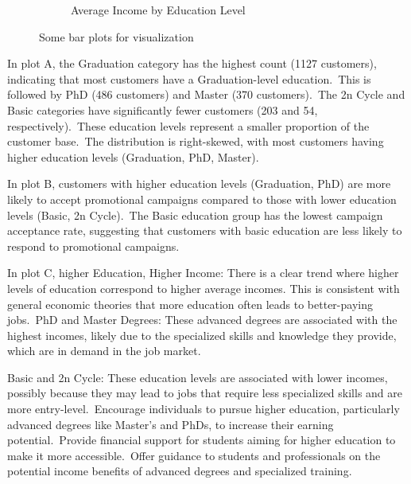\documentclass[a4paper]{article}
\begin{document}
\begin{figure}[h]
\begin{subfigure}{0.32\textwidth}
        \caption{Average Income by Education Level}
        \label{fig:sub3}
    \end{subfigure}
    \caption{Some bar plots for visualization}
    \label{fig:multi}
\end{figure}



\begin{multicols}{2} 

In plot A, the Graduation category has the highest count (1127 customers), indicating that most customers have a Graduation-level education.\
This is followed by PhD (486 customers) and Master (370 customers).\
The 2n Cycle and Basic categories have significantly fewer customers (203 and 54, respectively).\
These education levels represent a smaller proportion of the customer base.\
The distribution is right-skewed, with most customers having higher education levels (Graduation, PhD, Master).


In plot B, customers with higher education levels (Graduation, PhD) are more likely to accept promotional campaigns compared to those with lower education levels (Basic, 2n Cycle).\
The Basic education group has the lowest campaign acceptance rate, suggesting that customers with basic education are less likely to respond to promotional campaigns.


In plot C, higher Education, Higher Income: There is a clear trend where higher levels of education correspond to higher average incomes. This is consistent with general economic theories that more education often leads to better-paying jobs.\
PhD and Master Degrees: These advanced degrees are associated with the highest incomes, likely due to the specialized skills and knowledge they provide, which are in demand in the job market.\

Basic and 2n Cycle: These education levels are associated with lower incomes, possibly because they may lead to jobs that require less specialized skills and are more entry-level.\
Encourage individuals to pursue higher education, particularly advanced degrees like Master's and PhDs, to increase their earning potential.\
Provide financial support for students aiming for higher education to make it more accessible.\
Offer guidance to students and professionals on the potential income benefits of advanced degrees and specialized training.



\end{multicols}
\end{document}
